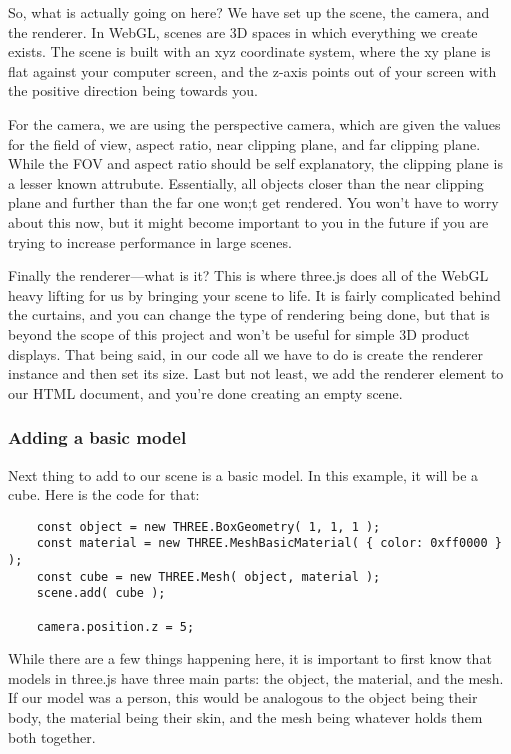 \documentclass[10pt,final,journal,compsoc]{IEEEtran}
\begin{document}
        So, what is actually going on here? We have set up the scene, the camera, and the renderer. In WebGL, scenes are 3D spaces in which everything we create exists. The scene is built with an xyz coordinate system, where the xy plane is flat against your computer screen, and the z-axis points out of your screen with the positive direction being towards you.
        
        For the camera, we are using the perspective camera, which are given the values for the field of view, aspect ratio, near clipping plane, and far clipping plane. While the FOV and aspect ratio should be self explanatory, the clipping plane is a lesser known attrubute. Essentially, all objects closer than the near clipping plane and further than the far one won;t get rendered. You won't have to worry about this now, but it might become important to you in the future if you are trying to increase performance in large scenes.
        
        Finally the renderer---what is it? This is where three.js does all of the WebGL heavy lifting for us by bringing your scene to life. It is fairly complicated behind the curtains, and you can change the type of rendering being done, but that is beyond the scope of this project and won't be useful for simple 3D product displays. That being said, in our code all we have to do is create the renderer instance and then set its size. Last but not least, we add the renderer element to our HTML document, and you're done creating an empty scene.
        
        \subsubsection{Adding a basic model}
        Next thing to add to our scene is a basic model. In this example, it will be a cube. Here is the code for that:
        
        \begin{lstlisting}
    const object = new THREE.BoxGeometry( 1, 1, 1 );
    const material = new THREE.MeshBasicMaterial( { color: 0xff0000 } );
    const cube = new THREE.Mesh( object, material );
    scene.add( cube );
        
    camera.position.z = 5;
        \end{lstlisting}
        
        While there are a few things happening here, it is important to first know that models in three.js have three main parts: the object, the material, and the mesh. If our model was a person, this would be analogous to the object being their body, the material being their skin, and the mesh being whatever holds them both together. 
        
\end{document}
